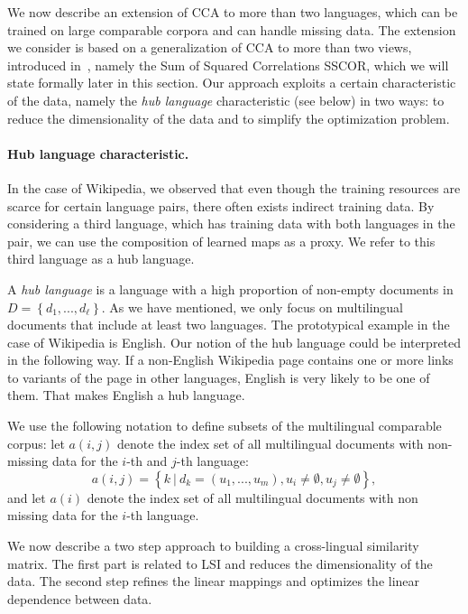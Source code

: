 We now describe an extension of CCA to more than two languages, which can be trained on 
large comparable corpora and can handle missing data. The extension we consider is based on 
a generalization of CCA to more than two views, introduced in~\cite{Kettenring}, namely 
the Sum of Squared Correlations SSCOR, which we will state formally later in this section. 
Our approach exploits a certain characteristic of the data, namely the \emph{hub language} 
characteristic (see below) in two ways: to reduce the dimensionality of the data and to 
simplify the optimization problem.

\paragraph{Hub language characteristic.}
In the case of Wikipedia, we observed that even though the training resources are scarce 
for certain language pairs, there often exists indirect training data. By considering 
a third language, which has training data with both languages in the pair,  we can use 
the composition of learned maps as a proxy. We refer to this third language as a hub language.

A \emph{hub language} is a language with a high proportion of non-empty documents in 
$D = \left\{d_1,..., d_{\ell}\right\}$. As we have mentioned, we only focus on multilingual 
documents that include at least two languages. The prototypical example in the case of 
Wikipedia is English. Our notion of the hub language could be interpreted in the following 
way. If a non-English Wikipedia page contains one or more links to variants of the page in 
other languages, English is very likely to be one of them. That makes English a hub language.

We use the following notation to define subsets of the multilingual comparable corpus: 
let $a(i,j)$ denote the index set of all multilingual documents with non-missing data 
for the $i$-th and $j$-th language: 
$$a(i,j) = \left\{k~ |~ d_k = (u_1,...,u_m), u_i \neq \emptyset, u_j \neq \emptyset \right\},$$ 
and let $a(i)$ denote the index set of all multilingual documents with non missing data 
for the $i$-th language.

We now describe a two step approach to building a cross-lingual similarity matrix. 
The first part is related to LSI and reduces the dimensionality of the data. The second 
step refines the linear mappings and optimizes the linear dependence between data.

